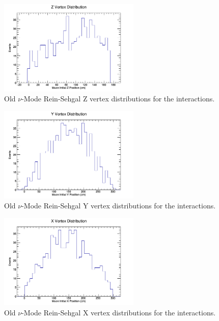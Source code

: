 \documentclass[11pt]{article}
\begin{document}
\begin{figure}[H]
\centering
\includegraphics[width=0.6\textwidth]{OldNMReinSehgalImages/2-ZVertexDistributionNMORS.png}
\caption{Old $\nu$-Mode Rein-Sehgal Z vertex distributions for the interactions.}
\end{figure}

\begin{figure}[H]
\centering
\includegraphics[width=0.6\textwidth]{OldNMReinSehgalImages/3-YVertexDistributionNMORS.png}
\caption{Old $\nu$-Mode Rein-Sehgal Y vertex distributions for the interactions.}
\end{figure}

\begin{figure}[H]
\centering
\includegraphics[width=0.6\textwidth]{OldNMReinSehgalImages/4-XVertexDistributionNMORS.png}
\caption{Old $\nu$-Mode Rein-Sehgal X vertex distributions for the interactions.}
\end{figure}
\end{document}
